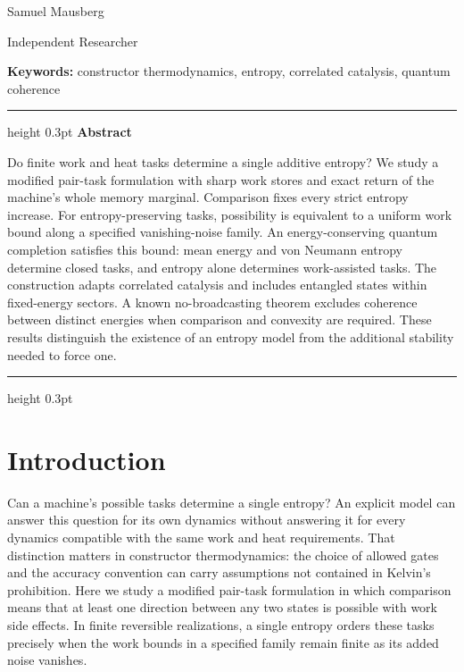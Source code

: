 \documentclass[11pt,a4paper]{article}
\begin{document}
\thispagestyle{firstpage}
\par
\smallskip
{}\par
\bigskip
{}
\bigskip
\noindent Samuel Mausberg\par
\noindent Independent Researcher\par
\medskip
\noindent\textbf{Keywords:} constructor thermodynamics, entropy, correlated catalysis, quantum coherence
\medskip
\hrule height 0.3pt
\smallskip
\noindent\textbf{Abstract}\par
\smallskip
\noindent Do finite work and heat tasks determine a single additive entropy? We study a modified pair-task formulation with sharp work stores and exact return of the machine's whole memory marginal. Comparison fixes every strict entropy increase. For entropy-preserving tasks, possibility is equivalent to a uniform work bound along a specified vanishing-noise family. An energy-conserving quantum completion satisfies this bound: mean energy and von Neumann entropy determine closed tasks, and entropy alone determines work-assisted tasks. The construction adapts correlated catalysis and includes entangled states within fixed-energy sectors. A known no-broadcasting theorem excludes coherence between distinct energies when comparison and convexity are required. These results distinguish the existence of an entropy model from the additional stability needed to force one.
\smallskip
\hrule height 0.3pt

\section{Introduction}
Can a machine's possible tasks determine a single entropy? An explicit model can answer this question for its own dynamics without answering it for every dynamics compatible with the same work and heat requirements. That distinction matters in constructor thermodynamics: the choice of allowed gates and the accuracy convention can carry assumptions not contained in Kelvin's prohibition. Here we study a modified pair-task formulation in which comparison means that at least one direction between any two states is possible with work side effects. In finite reversible realizations, a single entropy orders these tasks precisely when the work bounds in a specified family remain finite as its added noise vanishes.
\end{document}
